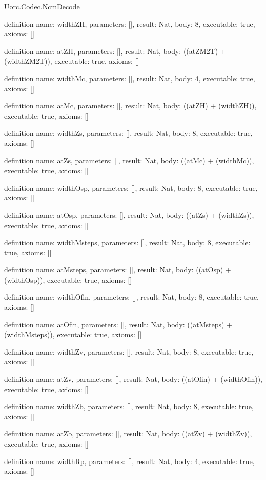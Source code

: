 \begin{lexlean}{Uorc.Codec.NcmDecode}
\begin{semanticmodule}
definition{
  name: widthZH,
  parameters: [],
  result: Nat,
  body: 8,
  executable: true,
  axioms: []
}

definition{
  name: atZH,
  parameters: [],
  result: Nat,
  body: ((atZM2T) + (widthZM2T)),
  executable: true,
  axioms: []
}

definition{
  name: widthMc,
  parameters: [],
  result: Nat,
  body: 4,
  executable: true,
  axioms: []
}

definition{
  name: atMc,
  parameters: [],
  result: Nat,
  body: ((atZH) + (widthZH)),
  executable: true,
  axioms: []
}

definition{
  name: widthZs,
  parameters: [],
  result: Nat,
  body: 8,
  executable: true,
  axioms: []
}

definition{
  name: atZs,
  parameters: [],
  result: Nat,
  body: ((atMc) + (widthMc)),
  executable: true,
  axioms: []
}

definition{
  name: widthOsp,
  parameters: [],
  result: Nat,
  body: 8,
  executable: true,
  axioms: []
}

definition{
  name: atOsp,
  parameters: [],
  result: Nat,
  body: ((atZs) + (widthZs)),
  executable: true,
  axioms: []
}

definition{
  name: widthMsteps,
  parameters: [],
  result: Nat,
  body: 8,
  executable: true,
  axioms: []
}

definition{
  name: atMsteps,
  parameters: [],
  result: Nat,
  body: ((atOsp) + (widthOsp)),
  executable: true,
  axioms: []
}

definition{
  name: widthOfin,
  parameters: [],
  result: Nat,
  body: 8,
  executable: true,
  axioms: []
}

definition{
  name: atOfin,
  parameters: [],
  result: Nat,
  body: ((atMsteps) + (widthMsteps)),
  executable: true,
  axioms: []
}

definition{
  name: widthZv,
  parameters: [],
  result: Nat,
  body: 8,
  executable: true,
  axioms: []
}

definition{
  name: atZv,
  parameters: [],
  result: Nat,
  body: ((atOfin) + (widthOfin)),
  executable: true,
  axioms: []
}

definition{
  name: widthZb,
  parameters: [],
  result: Nat,
  body: 8,
  executable: true,
  axioms: []
}

definition{
  name: atZb,
  parameters: [],
  result: Nat,
  body: ((atZv) + (widthZv)),
  executable: true,
  axioms: []
}

definition{
  name: widthRp,
  parameters: [],
  result: Nat,
  body: 4,
  executable: true,
  axioms: []
}


\end{semanticmodule}
\end{lexlean}
